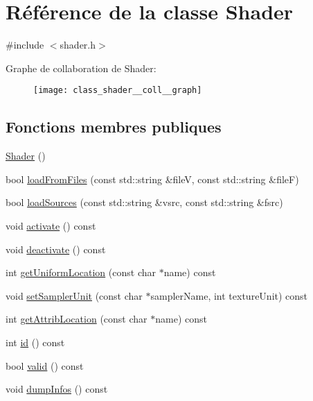 \hypertarget{class_shader}{}\section{Référence de la classe Shader}
\label{class_shader}


{\ttfamily \#include $<$shader.\+h$>$}



Graphe de collaboration de Shader\+:
\nopagebreak
\begin{figure}[H]
\begin{center}
\leavevmode
\texttt{[image: class\_shader\_\_coll\_\_graph]}
\end{center}
\end{figure}
\subsection*{Fonctions membres publiques}
\begin{DoxyCompactItemize}
\item 
\hyperlink{class_shader_a0d654ebaca4e0555197c0724c6d30610}{Shader} ()
\item 
bool \hyperlink{class_shader_ab3326b4493672d0e456e05d9b64c7b28}{load\+From\+Files} (const std\+::string \&fileV, const std\+::string \&fileF)
\item 
bool \hyperlink{class_shader_ac849c6315a283ebf04571ca62000c187}{load\+Sources} (const std\+::string \&vsrc, const std\+::string \&fsrc)
\item 
void \hyperlink{class_shader_aac46b11981aef0616f45e191201f519a}{activate} () const
\item 
void \hyperlink{class_shader_ae7a6e4cdb7719dc501a61d6ef732ad98}{deactivate} () const
\item 
int \hyperlink{class_shader_ae42ef5734471e2cdf1e5045c8883961d}{get\+Uniform\+Location} (const char $\ast$name) const
\item 
void \hyperlink{class_shader_ae6ebc266e4706be4b040fe23aced651a}{set\+Sampler\+Unit} (const char $\ast$sampler\+Name, int texture\+Unit) const
\item 
int \hyperlink{class_shader_a4287e8012d956746f99cf8d1d6a126f8}{get\+Attrib\+Location} (const char $\ast$name) const
\item 
int \hyperlink{class_shader_ac6f8837bdac2997de1a79c9a518c664c}{id} () const
\item 
bool \hyperlink{class_shader_ade2fdfa75d4447eaac246b8d3b799cec}{valid} () const
\item 
void \hyperlink{class_shader_af4bd705b0eb25ec610dffb4b5d694641}{dump\+Infos} () const
\end{DoxyCompactItemize}
